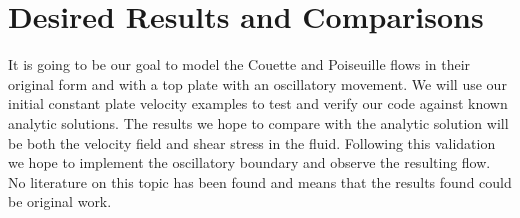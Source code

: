 \documentclass[a4paper,12pt,titlepage]{article}
\begin{document}
\section{Desired Results and Comparisons}

It is going to be our goal to model the Couette and Poiseuille flows in their original form and with a top plate with an oscillatory movement.  We will use our initial constant plate velocity examples to test and verify our code against known analytic solutions.  The results we hope to compare with the analytic solution will be both the velocity field and shear stress in the fluid.  Following this validation we hope to implement the oscillatory boundary and observe the resulting flow.  No literature on this topic has been found and means that the results found could be original work.  





\end{document}
